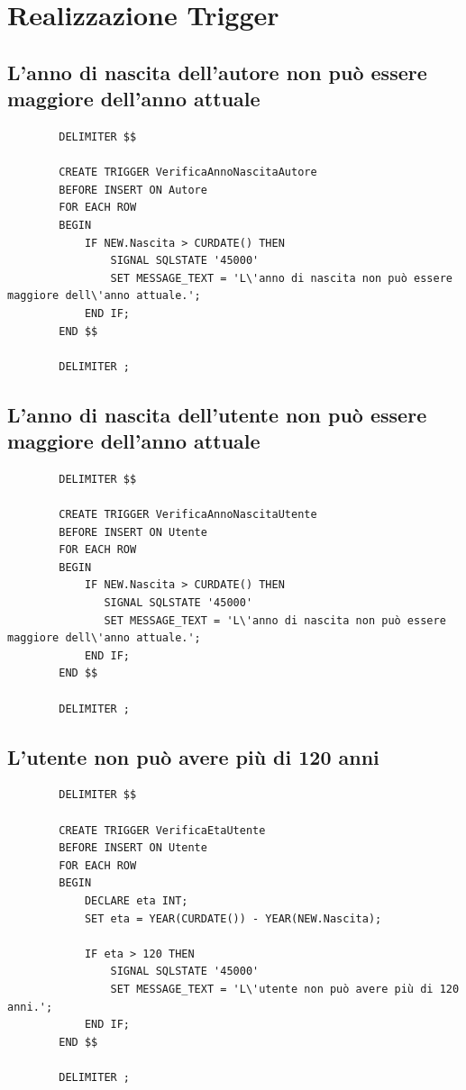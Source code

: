 \documentclass{article}
\begin{document}
    \section{Realizzazione Trigger}
    
    \subsection{L’anno di nascita dell’autore non può essere maggiore dell’anno attuale}
    
    \begin{verbatim}
        DELIMITER $$

        CREATE TRIGGER VerificaAnnoNascitaAutore
        BEFORE INSERT ON Autore
        FOR EACH ROW
        BEGIN
            IF NEW.Nascita > CURDATE() THEN
                SIGNAL SQLSTATE '45000'
                SET MESSAGE_TEXT = 'L\'anno di nascita non può essere maggiore dell\'anno attuale.';
            END IF;
        END $$

        DELIMITER ;
    \end{verbatim}
    
    \subsection{L’anno di nascita dell’utente non può essere maggiore dell’anno attuale}

    \begin{verbatim}
        DELIMITER $$

        CREATE TRIGGER VerificaAnnoNascitaUtente
        BEFORE INSERT ON Utente
        FOR EACH ROW
        BEGIN
            IF NEW.Nascita > CURDATE() THEN
               SIGNAL SQLSTATE '45000'
               SET MESSAGE_TEXT = 'L\'anno di nascita non può essere maggiore dell\'anno attuale.';
            END IF;
        END $$

        DELIMITER ;
    \end{verbatim}
    
    \subsection{L’utente non può avere più di 120 anni}
    
    \begin{verbatim}
        DELIMITER $$
        
        CREATE TRIGGER VerificaEtaUtente
        BEFORE INSERT ON Utente
        FOR EACH ROW
        BEGIN
            DECLARE eta INT;
            SET eta = YEAR(CURDATE()) - YEAR(NEW.Nascita);

            IF eta > 120 THEN
                SIGNAL SQLSTATE '45000'
                SET MESSAGE_TEXT = 'L\'utente non può avere più di 120 anni.';
            END IF;
        END $$

        DELIMITER ;

    \end{verbatim}
    
\end{document}
